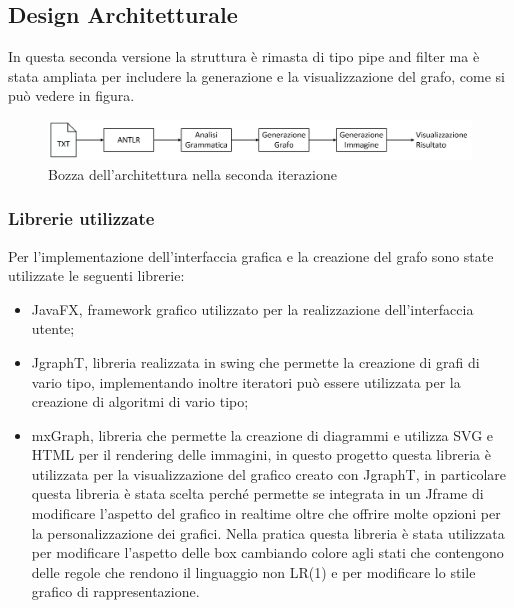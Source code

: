 \documentclass[12pt]{article}
\begin{document}
\subsection{Design Architetturale}
In questa seconda versione la struttura è rimasta di tipo pipe and filter ma è stata ampliata per includere la generazione e la visualizzazione del grafo, come si può vedere in figura.
\begin{figure}[h]
\centering
\includegraphics[width=\textwidth]{immagini/bozzaArchitettura_v2.png}
\caption{Bozza dell'architettura nella seconda iterazione}
\end{figure}
\pagebreak
\subsubsection{Librerie utilizzate}
Per l'implementazione dell'interfaccia grafica e la creazione del grafo sono state utilizzate le seguenti librerie:
\begin{itemize}
\item JavaFX, framework grafico utilizzato per la realizzazione dell'interfaccia utente;
\item JgraphT, libreria realizzata in swing che permette la creazione di grafi di vario tipo, implementando inoltre iteratori può essere utilizzata per la creazione di algoritmi di vario tipo;
\item mxGraph, libreria che permette la creazione di diagrammi e utilizza SVG e HTML per il rendering delle immagini, in questo progetto questa libreria è utilizzata per la visualizzazione del grafico creato con JgraphT, in particolare questa libreria è stata scelta perché permette se integrata in un Jframe di modificare l'aspetto del grafico in realtime oltre che offrire molte opzioni per la personalizzazione dei grafici.
Nella pratica questa libreria è stata utilizzata per modificare l'aspetto delle box cambiando colore agli stati che contengono delle regole che rendono il linguaggio non LR(1) e per modificare lo stile grafico di rappresentazione.
\end{itemize}
\end{document}
